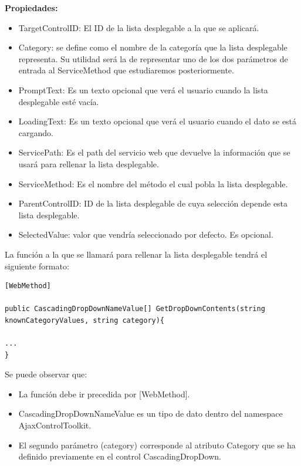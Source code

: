 \textbf{Propiedades:}
\begin{itemize}


	\item TargetControlID: El ID de la lista desplegable a la que se aplicará.
	
	\item  Category: se define como el nombre de la categoría que la lista desplegable representa. Su utilidad será la de representar uno de los dos parámetros de entrada al ServiceMethod que estudiaremos posteriormente.
	
	\item  PromptText: Es un texto opcional que verá el usuario cuando la lista desplegable esté vacía.
	
	\item  LoadingText: Es un texto opcional que verá el usuario cuando el dato se está cargando.
	
	\item  ServicePath: Es el path del servicio web que devuelve la información que se usará para rellenar la lista desplegable.
	
	\item  ServiceMethod: Es el nombre del método el cual pobla la lista desplegable.
	
	\item  ParentControlID: ID de la lista desplegable de cuya selección depende esta lista desplegable.
	
	\item  SelectedValue: valor que vendría seleccionado por defecto. Es opcional. 
\end{itemize}



La función a la que se llamará  para rellenar la lista desplegable tendrá el siguiente formato:

 \lstset{language=C, breaklines=true, basicstyle=\footnotesize}
 \begin{lstlisting}[frame=single]
[WebMethod]

public CascadingDropDownNameValue[] GetDropDownContents(string knownCategoryValues, string category){

...
} 
 \end{lstlisting}
 
 Se puede observar que:
 \begin{itemize}
 	\item La función debe ir precedida por [WebMethod].
 	\item CascadingDropDownNameValue es un tipo de dato dentro del namespace AjaxControlToolkit.
 	\item El segundo parámetro (category)  corresponde al atributo Category que  se ha definido previamente en el control CascadingDropDown. 
 \end{itemize}